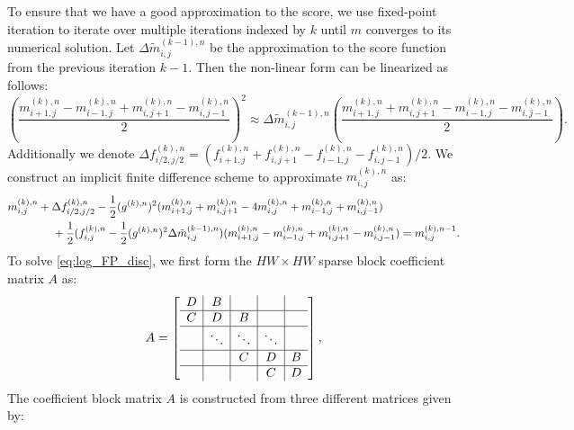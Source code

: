 \documentclass[]{interact}
\theoremstyle{plain}%
\theoremstyle{definition}
\theoremstyle{remark}
\begin{document}
To ensure that we have a good approximation to the score, we use fixed-point iteration to iterate over multiple iterations indexed by $k$ until $m$ converges to its numerical solution. Let $\Delta \tilde{m}^{(k-1),n}_{i,j}$ be the approximation to the score function from the previous iteration $k-1$. Then the non-linear form can be linearized as follows:
\begin{equation}
    (\frac{m_{i+1,j}^{(k),n} - m_{i-1,j}^{(k),n} + m_{i,j+1}^{(k),n} - m_{i,j-1}^{(k),n}}{2})^2 \approx \Delta \tilde{m}^{(k-1),n}_{i,j}(\frac{m_{i+1,j}^{(k),n} + m^{(k),n}_{i,j+1} - m_{i-1,j}^{(k),n}-m_{i,j-1}^{(k),n}}{2}).
\end{equation}
Additionally we denote $\Delta f^{(k),n}_{i/2,j/2} = (f_{i+1,j}^{(k),n} + f_{i,j+1}^{(k),n} - f_{i-1,j}^{(k),n} - f_{i,j-1}^{(k),n})/2$. We construct an implicit finite difference scheme to approximate $m^{(k),n}_{i,j}$ as:
\begin{align}
    \label{eq:log_FP_disc}
    m^{(k),n}_{i,j} &+ \Delta f^{(k),n}_{i/2,j/2} - \frac{1}{2}(g^{(k),n})^2(m_{i+1,j}^{(k),n} + m_{i,j+1}^{(k),n} - 4m_{i,j}^{(k),n} + m_{i-1,j}^{(k),n} + m_{i,j-1}^{(k),n})\\ 
    & \hspace{0.45cm} + \frac{1}{2}(f^{(k),n}_{i,j} - \frac{1}{2}(g^{(k),n})^2\Delta \tilde{m}^{(k-1),n}_{i,j})(m_{i+1,j}^{(k),n} - m_{i-1,j}^{(k),n} + m_{i,j+1}^{(k),n} - m_{i,j-1}^{(k),n}) = m^{(k),n-1}_{i,j}. \nonumber
\end{align}
To solve \eqref{eq:log_FP_disc}, we first form the $HW\times HW$ sparse block coefficient matrix $A$ as:
\begin{equation}
    A = \left[\begin{array}{ c | c | c| c| c}
    D & B & & & \\
    \hline
    C & D & B & & \\
    \hline
     & \ddots & \ddots & \ddots\\
    \hline
     & & C & D & B\\
    \hline
     & & & C & D
  \end{array}\right],
\end{equation}
The coefficient block matrix $A$ is constructed from three different matrices given by:
\end{document}
